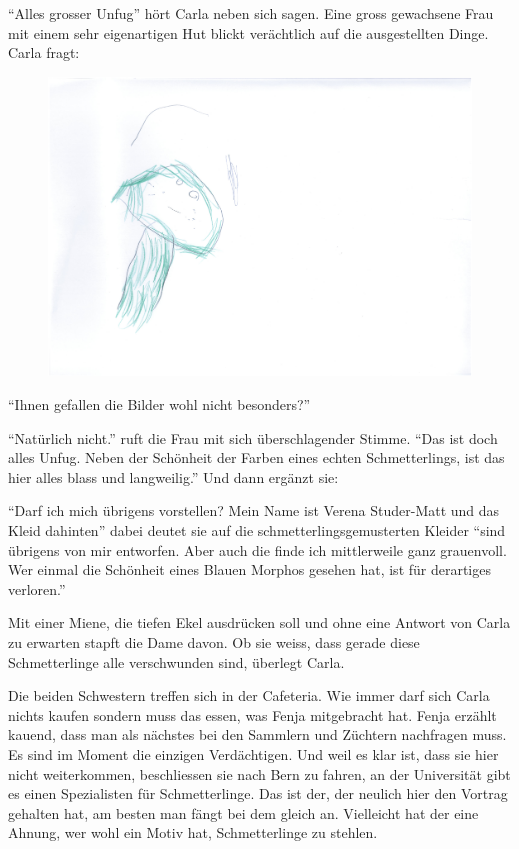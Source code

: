 \enquote{Alles grosser Unfug} hört Carla neben sich sagen. Eine gross gewachsene Frau mit einem sehr eigenartigen Hut blickt verächtlich auf die ausgestellten Dinge. Carla fragt:

\begin{figure}[hb]
\centering
\includegraphics[width=.5\textwidth]{bilder/schmetterlingg.pdf}
\end{figure}



\enquote{Ihnen gefallen die Bilder wohl nicht besonders?}

\enquote{Natürlich nicht.} ruft die Frau mit sich überschlagender Stimme. \enquote{Das ist doch alles Unfug. Neben der Schönheit der Farben eines echten Schmetterlings, ist das hier alles blass und langweilig.} Und dann ergänzt sie:

\enquote{Darf ich mich übrigens vorstellen? Mein Name ist Verena Studer-Matt und das Kleid dahinten} dabei deutet sie auf die schmetterlingsgemusterten Kleider \enquote{sind übrigens von mir entworfen. Aber auch die finde ich mittlerweile ganz grauenvoll. Wer einmal die Schönheit eines Blauen Morphos gesehen hat, ist für derartiges verloren.} 


Mit einer Miene, die tiefen Ekel ausdrücken soll und ohne eine Antwort von Carla zu erwarten stapft die Dame davon. Ob sie weiss, dass gerade diese Schmetterlinge alle verschwunden sind, überlegt Carla.

Die beiden Schwestern treffen sich in der Cafeteria. Wie immer darf sich Carla nichts kaufen sondern muss das essen, was Fenja mitgebracht hat. Fenja erzählt kauend, dass man als nächstes bei den Sammlern und Züchtern nachfragen muss. Es sind im Moment die einzigen Verdächtigen. Und weil es klar ist, dass sie hier nicht weiterkommen, beschliessen sie nach Bern zu fahren, an der Universität gibt es einen Spezialisten für Schmetterlinge. Das ist der, der neulich hier den Vortrag gehalten hat, am besten man fängt bei dem gleich an. Vielleicht hat der eine Ahnung, wer wohl ein Motiv hat, Schmetterlinge zu stehlen.
\begin{center}
\aldineleft
\end{center}

